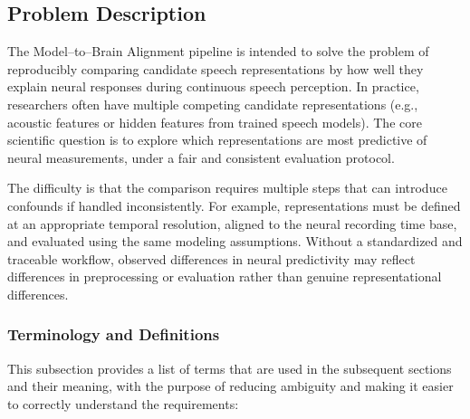 \documentclass[12pt]{article}
\begin{document}

\subsection{Problem Description} \label{Sec_pd}

The Model–to–Brain Alignment pipeline is intended to solve the problem of reproducibly comparing candidate speech representations by how well they explain neural responses during continuous speech perception. 
In practice, researchers often have multiple competing candidate representations (e.g., acoustic features or hidden features from trained speech models). The core scientific
question is to explore which representations are most predictive of neural measurements, under a fair and consistent evaluation protocol.

The difficulty is that the comparison requires multiple steps that can introduce confounds if handled inconsistently. For example, representations must be defined at an appropriate temporal resolution, aligned to the neural recording time base, and evaluated using the same modeling assumptions. 
Without a standardized and traceable workflow, observed differences in neural predictivity may reflect differences in preprocessing or evaluation rather than genuine representational differences.






\subsubsection{Terminology and  Definitions}


This subsection provides a list of terms that are used in the subsequent
sections and their meaning, with the purpose of reducing ambiguity and making it
easier to correctly understand the requirements:
\end{document}
